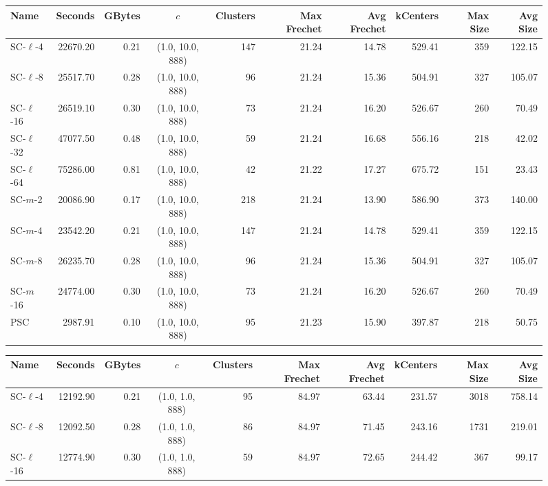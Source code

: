 \begin{figure} \begin{center}
    \begin{minipage}{\textwidth}
    {
    \begin{tabular}{@{}lrrcrrrrrr@{}}
        \toprule
        Name & Seconds & GBytes & $c$ & Clusters & Max Frechet & Avg Frechet & kCenters & Max Size & Avg Size\\
        \midrule
        SC-$\ell$-4 & 22670.20 & 0.21 & (1.0, 10.0, 888) & 147 & 21.24 & 14.78 & 529.41 & 359 & 122.15\\
        SC-$\ell$-8 & 25517.70 & 0.28 & (1.0, 10.0, 888) & 96 & 21.24 & 15.36 & 504.91 & 327 & 105.07\\
        SC-$\ell$-16 & 26519.10 & 0.30 & (1.0, 10.0, 888) & 73 & 21.24 & 16.20 & 526.67 & 260 & 70.49\\
        SC-$\ell$-32 & 47077.50 & 0.48 & (1.0, 10.0, 888) & 59 & 21.24 & 16.68 & 556.16 & 218 & 42.02\\
        SC-$\ell$-64 & 75286.00 & 0.81 & (1.0, 10.0, 888) & 42 & 21.22 & 17.27 & 675.72 & 151 & 23.43\\
        SC-$m$-2 & 20086.90 & 0.17 & (1.0, 10.0, 888) & 218 & 21.24 & 13.90 & 586.90 & 373 & 140.00\\
        SC-$m$-4 & 23542.20 & 0.21 & (1.0, 10.0, 888) & 147 & 21.24 & 14.78 & 529.41 & 359 & 122.15\\
        SC-$m$-8 & 26235.70 & 0.28 & (1.0, 10.0, 888) & 96 & 21.24 & 15.36 & 504.91 & 327 & 105.07\\
        SC-$m$-16 & 24774.00 & 0.30 & (1.0, 10.0, 888) & 73 & 21.24 & 16.20 & 526.67 & 260 & 70.49\\
        PSC & 2987.91 & 0.10 & (1.0, 10.0, 888) & 95 & 21.23 & 15.90 & 397.87 & 218 & 50.75 \\
        \bottomrule
    \end{tabular}}
    {
    \begin{tabular}{@{}lrrcrrrrrr@{}}
        \toprule
        Name & Seconds & GBytes & $c$ & Clusters & Max Frechet & Avg Frechet & kCenters & Max Size & Avg Size\\
        \midrule
        SC-$\ell$-4 & 12192.90 & 0.21 & (1.0, 1.0, 888) & 95 & 84.97 & 63.44 & 231.57 & 3018 & 758.14\\
        SC-$\ell$-8 & 12092.50 & 0.28 & (1.0, 1.0, 888) & 86 & 84.97 & 71.45 & 243.16 & 1731 & 219.01\\
        SC-$\ell$-16 & 12774.90 & 0.30 & (1.0, 1.0, 888) & 59 & 84.97 & 72.65 & 244.42 & 367 & 99.17\\

\end{tabular}}
\end{minipage}
\end{center}
\end{figure}
